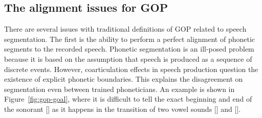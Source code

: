 \subsection{The alignment issues for GOP}
\label{sec:alignment_issues}
There are several issues with traditional definitions of GOP related to speech segmentation.
The first is the ability to perform a perfect alignment of phonetic segments to the recorded speech.
Phonetic segmentation is an ill-posed problem because it is based on the assumption that speech is produced as a sequence of discrete events.
However, coarticulation effects in speech production question the existence of explicit phonetic boundaries.
This explains the disagreement on segmentation even between trained phoneticians.
An example is shown in Figure~\ref{fig:gop-goal}, where it is difficult to tell the exact beginning and end of the sonorant [\ipaW] as it happens in the transition of two vowel sounds [\ipaIH] and [\ipaAH].

